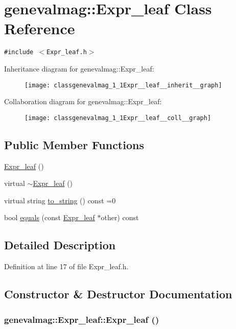 \hypertarget{classgenevalmag_1_1Expr__leaf}{
\section{genevalmag::Expr\_\-leaf Class Reference}
\label{classgenevalmag_1_1Expr__leaf}
}
{\tt \#include $<$Expr\_\-leaf.h$>$}

Inheritance diagram for genevalmag::Expr\_\-leaf:\nopagebreak
\begin{figure}[H]
\begin{center}
\leavevmode
\texttt{[image: classgenevalmag\_1\_1Expr\_\_leaf\_\_inherit\_\_graph]}
\end{center}
\end{figure}
Collaboration diagram for genevalmag::Expr\_\-leaf:\nopagebreak
\begin{figure}[H]
\begin{center}
\leavevmode
\texttt{[image: classgenevalmag\_1\_1Expr\_\_leaf\_\_coll\_\_graph]}
\end{center}
\end{figure}
\subsection*{Public Member Functions}
\begin{CompactItemize}
\item 
\hyperlink{classgenevalmag_1_1Expr__leaf_5deba73ccc015e6c1d926b9d11fbefb5}{Expr\_\-leaf} ()
\item 
virtual \hyperlink{classgenevalmag_1_1Expr__leaf_435c12ce45debdded6be221b0da68c7e}{$\sim$Expr\_\-leaf} ()
\item 
virtual string \hyperlink{classgenevalmag_1_1Expr__leaf_96854f59a155b173b6e79007d87bdad5}{to\_\-string} () const =0
\item 
bool \hyperlink{classgenevalmag_1_1Expr__leaf_115a2d203c018eab86e8973b610f7d28}{equals} (const \hyperlink{classgenevalmag_1_1Expr__leaf}{Expr\_\-leaf} $\ast$other) const 
\end{CompactItemize}


\subsection{Detailed Description}


Definition at line 17 of file Expr\_\-leaf.h.

\subsection{Constructor \& Destructor Documentation}
\hypertarget{classgenevalmag_1_1Expr__leaf_5deba73ccc015e6c1d926b9d11fbefb5}{
\subsubsection[{Expr\_\-leaf}]{\setlength{\rightskip}{0pt plus 5cm}genevalmag::Expr\_\-leaf::Expr\_\-leaf ()}}
\label{classgenevalmag_1_1Expr__leaf_5deba73ccc015e6c1d926b9d11fbefb5}


